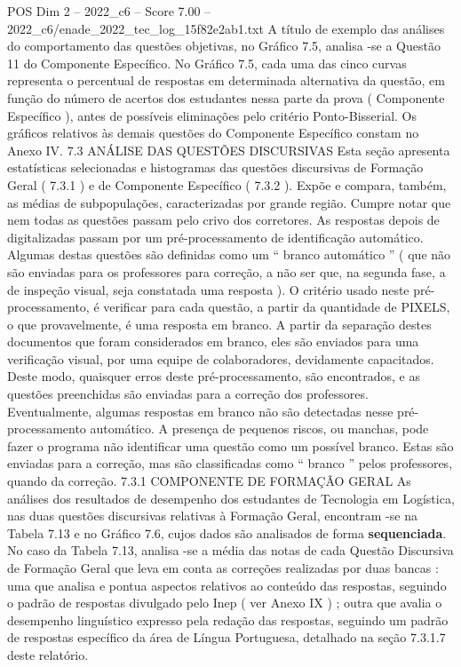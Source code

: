 \begin{textsample}{POS Dim 2 – 2022\_c6 – Score 7.00 – 2022\_c6/enade\_2022\_tec\_log\_15f82e2ab1.txt}
A título de exemplo das análises do comportamento das questões objetivas, no Gráfico 7.5, analisa -se a Questão 11 do Componente Específico.
No Gráfico 7.5, cada uma das cinco curvas representa o percentual de respostas em determinada alternativa da questão, em função do número de acertos dos estudantes nessa parte da prova ( Componente Específico ), antes de possíveis eliminações pelo critério Ponto-Bisserial.
Os gráficos relativos às demais questões do Componente Específico constam no Anexo IV. 7.3 ANÁLISE DAS QUESTÕES DISCURSIVAS Esta seção apresenta estatísticas selecionadas e histogramas das questões discursivas de Formação Geral ( 7.3.1 ) e de Componente Específico ( 7.3.2 ).
Expõe e compara, também, as médias de subpopulações, caracterizadas por grande região.
Cumpre notar que nem todas as questões passam pelo crivo dos corretores.
As respostas depois de digitalizadas passam por um pré-processamento de identificação automático.
Algumas destas questões são definidas como um “ branco automático ” ( que não são enviadas para os professores para correção, a não ser que, na segunda fase, a de inspeção visual, seja constatada uma resposta ).
O critério usado neste pré-processamento, é verificar para cada questão, a partir da quantidade de PIXELS, o que provavelmente, é uma resposta em branco.
A partir da separação destes documentos que foram considerados em branco, eles são enviados para uma verificação visual, por uma equipe de colaboradores, devidamente capacitados.
Deste modo, quaisquer erros deste pré-processamento, são encontrados, e as questões preenchidas são enviadas para a correção dos professores.
Eventualmente, algumas respostas em branco não são detectadas nesse pré-processamento automático.
A presença de pequenos riscos, ou manchas, pode fazer o programa não identificar uma questão como um possível branco.
Estas são enviadas para a correção, mas são classificadas como “ branco ” pelos professores, quando da correção. 7.3.1 COMPONENTE DE FORMAÇÃO GERAL As análises dos resultados de desempenho dos estudantes de Tecnologia em Logística, nas duas questões discursivas relativas à Formação Geral, encontram -se na Tabela 7.13 e no Gráfico 7.6, cujos dados são analisados de forma \textbf{sequenciada}.
No caso da Tabela 7.13, analisa -se a média das notas de cada Questão Discursiva de Formação Geral que leva em conta as correções realizadas por duas bancas : uma que analisa e pontua aspectos relativos ao conteúdo das respostas, seguindo o padrão de respostas divulgado pelo Inep ( ver Anexo IX ) ; outra que avalia o desempenho linguístico expresso pela redação das respostas, seguindo um padrão de respostas específico da área de Língua Portuguesa, detalhado na seção 7.3.1.7 deste relatório.

\end{textsample}
